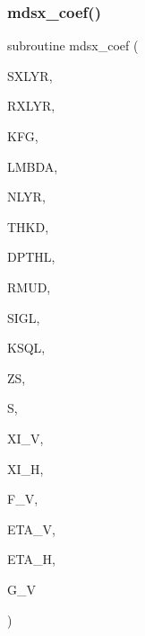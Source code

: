 \subsubsection{\texorpdfstring{mdsx\+\_\+coef()}{mdsx\_coef()}}
{\footnotesize\ttfamily subroutine mdsx\+\_\+coef (\begin{DoxyParamCaption}\item[{integer}]{S\+X\+L\+YR,  }\item[{integer}]{R\+X\+L\+YR,  }\item[{integer}]{K\+FG,  }\item[{real(kind=ql)}]{L\+M\+B\+DA,  }\item[{integer}]{N\+L\+YR,  }\item[{real(kind=ql), dimension (nlyr)}]{T\+H\+KD,  }\item[{real(kind=ql), dimension (nlyr)}]{D\+P\+T\+HL,  }\item[{real(kind=ql), dimension(0\+:nlyr)}]{R\+M\+UD,  }\item[{complex(kind=ql), dimension (nlyr)}]{S\+I\+GL,  }\item[{complex(kind=ql), dimension (nlyr)}]{K\+S\+QL,  }\item[{real(kind=ql)}]{ZS,  }\item[{complex(kind=ql), dimension (0\+:nlyr)}]{S,  }\item[{complex(kind=ql)}]{X\+I\+\_\+V,  }\item[{complex(kind=ql)}]{X\+I\+\_\+H,  }\item[{complex(kind=ql)}]{F\+\_\+V,  }\item[{complex(kind=ql)}]{E\+T\+A\+\_\+V,  }\item[{complex(kind=ql)}]{E\+T\+A\+\_\+H,  }\item[{complex(kind=ql)}]{G\+\_\+V }\end{DoxyParamCaption})}

